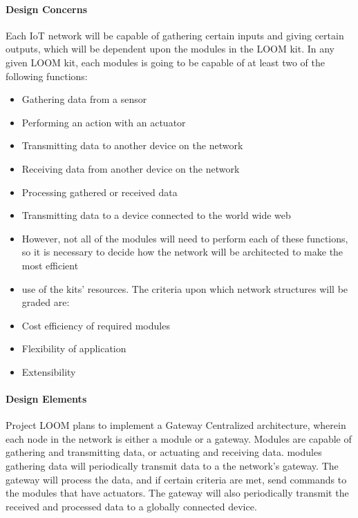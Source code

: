\documentclass[onecolumn, draftclsnofoot,10pt, compsoc]{IEEEtran}
\begin{document}
\paragraph{Design Concerns}
    Each IoT network will be capable of gathering certain inputs and giving certain outputs, which will be dependent upon the modules in the LOOM kit. In any given LOOM kit, each modules is going to be capable of at least two of the following functions:

    \begin{itemize}[noitemsep,topsep=-10pt]
        \item Gathering data from a sensor
        \item Performing an action with an actuator
        \item Transmitting data to another device on the network
        \item Receiving data from another device on the network
        \item Processing gathered or received data
        \item Transmitting data to a device connected to the world wide web
        \item However, not all of the modules will need to perform each of these functions, so it is necessary to decide how the network will be architected to make the most efficient
        \item use of the kits' resources. The criteria upon which network structures will be graded are: 
        \item Cost efficiency of required modules
        \item Flexibility of application
        \item Extensibility
    \end{itemize}

\paragraph{Design Elements}
    Project LOOM plans to implement a Gateway Centralized architecture, wherein each node in the network is either a module or a gateway. Modules are capable of gathering and transmitting data, or actuating and receiving data. modules gathering data will periodically transmit data to a the network's gateway. The gateway will process the data, and if certain criteria are met, send commands to the modules that have actuators. The gateway will also periodically transmit the received and processed data to a globally connected device. 
\end{document}
